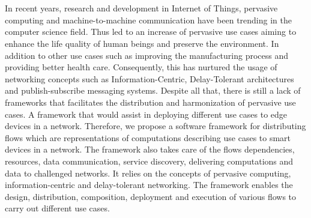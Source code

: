 \chapter{\abstractname}
In recent years, research and development in Internet of Things, pervasive computing and machine-to-machine communication have been trending  in the computer science field. Thus led to an increase of pervasive use cases aiming to enhance the  life quality of human beings and preserve the environment. In addition to other use cases such as improving the manufacturing  process and providing better health care. Consequently, this has nurtured  the usage of networking concepts such as Information-Centric, Delay-Tolerant architectures and publish-subscribe messaging systems. Despite all that, there is still a lack of frameworks that facilitates the distribution and harmonization of pervasive use cases. A framework that would assist in deploying different use cases to edge devices in a network. %
 Therefore, we propose a software framework for distributing flows which are representations of computations describing use cases to smart devices in a network. The framework also takes care of the flows dependencies, resources, data communication, service discovery, delivering computations and data to challenged networks. It relies on the concepts of pervasive computing, information-centric and delay-tolerant networking. The framework enables the design, distribution, composition, deployment and execution of various flows to carry out different use cases.


